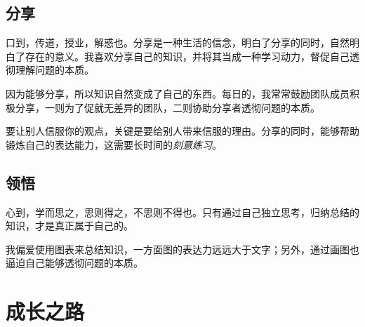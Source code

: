 \begin{content}
\subsection{分享}

口到，传道，授业，解惑也。分享是一种生活的信念，明白了分享的同时，自然明白了存在的意义。我喜欢分享自己的知识，并将其当成一种学习动力，督促自己透彻理解问题的本质。

因为能够分享，所以知识自然变成了自己的东西。每日的，我常常鼓励团队成员积极分享，一则为了促就无差异的团队，二则协助分享者透彻问题的本质。

要让别人信服你的观点，关键是要给别人带来信服的理由。分享的同时，能够帮助锻炼自己的表达能力，这需要长时间的\emph{刻意练习}。

\subsection{领悟}

心到，学而思之，思则得之，不思则不得也。只有通过自己独立思考，归纳总结的知识，才是真正属于自己的。

我偏爱使用图表来总结知识，一方面图的表达力远远大于文字；另外，通过画图也逼迫自己能够透彻问题的本质。

\end{content}

\section{成长之路}

